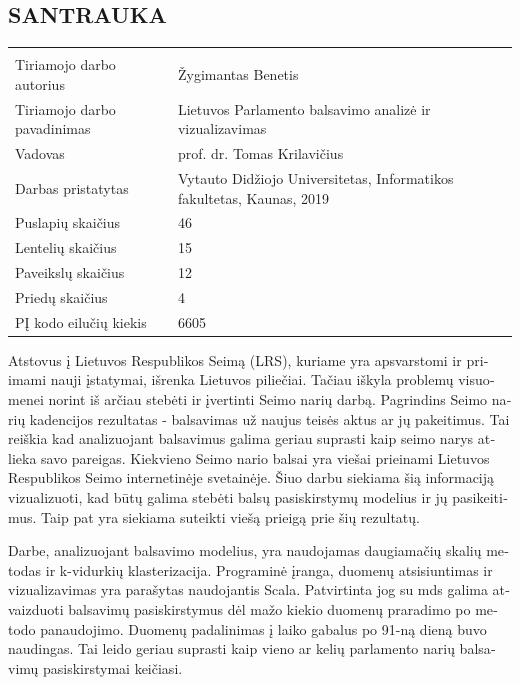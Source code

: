 \documentclass[a4paper,12pt]{article}
\begin{document}
	\clearpage
	
	\begin{center}
		\section*{SANTRAUKA}
	\end{center}
	
	\noindent
	\begin{center}
		\begin{tabular}{L{4.5cm} L{8cm}}
			\\ 
			Tiriamojo darbo autorius & Žygimantas Benetis \\
			Tiriamojo darbo pavadinimas & Lietuvos Parlamento balsavimo analizė ir vizualizavimas\\
			Vadovas & prof. dr. Tomas Krilavičius\\
			Darbas pristatytas & Vytauto Didžiojo Universitetas, Informatikos fakultetas, Kaunas, 2019\\
			Puslapių skaičius & 46\\
			Lentelių skaičius & 15\\
			Paveikslų skaičius & 12\\
			Priedų skaičius & 4\\
			PĮ kodo eilučių kiekis & 6605\\
		\end{tabular}
	\end{center} 
	\begin{otherlanguage}{lithuanian}
		Atstovus į Lietuvos Respublikos Seimą (LRS), kuriame yra apsvarstomi ir priimami nauji įstatymai, išrenka Lietuvos piliečiai. Tačiau iškyla problemų visuomenei norint iš arčiau stebėti ir įvertinti Seimo narių darbą. Pagrindins Seimo narių kadencijos rezultatas - balsavimas už naujus teisės aktus ar jų pakeitimus. Tai reiškia kad analizuojant balsavimus galima geriau suprasti kaip seimo narys atlieka savo pareigas. Kiekvieno Seimo nario balsai yra viešai prieinami Lietuvos Respublikos Seimo internetinėje svetainėje. Šiuo darbu siekiama šią informaciją vizualizuoti, kad būtų galima stebėti balsų pasiskirstymų modelius ir jų pasikeitimus. Taip pat yra siekiama suteikti viešą prieigą prie šių rezultatų.
		
		Darbe, analizuojant balsavimo modelius, yra naudojamas daugiamačių skalių metodas ir k-vidurkių klasterizacija. Programinė įranga, duomenų atsisiuntimas ir vizualizavimas yra parašytas naudojantis Scala. Patvirtinta jog su \gls{mds} galima atvaizduoti balsavimų pasiskirstymus dėl mažo kiekio duomenų praradimo po metodo panaudojimo. Duomenų padalinimas į laiko gabalus po 91-ną dieną buvo naudingas. Tai leido geriau suprasti kaip vieno ar kelių parlamento narių balsavimų pasiskirstymai keičiasi.
		
	\end{otherlanguage}
	
\end{document}
